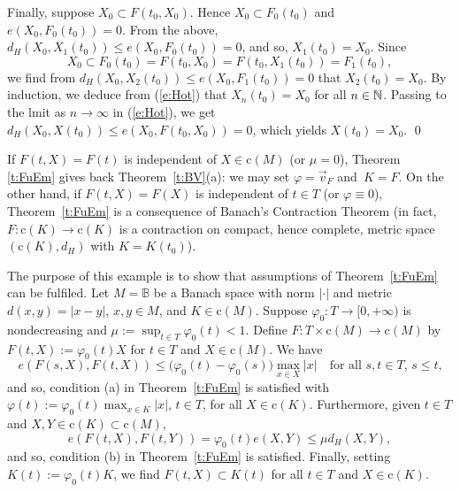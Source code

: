 \documentclass[preprint,12pt]{elsarticle}
\newcommand{\eq}[1]{\mbox{\rm(\ref{#1})}}
\newcommand{\ori}[1]{{\scriptscriptstyle\overrightarrow{\mbox{$#1$}}}}
\begin{document}
\begin{pf}
Finally, suppose $X_0\!\subset\! F(t_0,X_0)$. Hence $X_0\!\subset\! F_0(t_0)$ and
$e(X_0,F_0(t_0))\!=\!0$. From the above,
$d_H(X_0,X_1(t_0))\!\le\! e(X_0,F_0(t_0))\!=\!0$,
and so, $X_1(t_0)\!=\!X_0$. Since
  \begin{equation*}
X_0\subset F_0(t_0)=F(t_0,X_0)=F(t_0,X_1(t_0))=F_1(t_0),
  \end{equation*}
we find from $d_H(X_0,X_2(t_0))\le e(X_0,F_1(t_0))=0$ that $X_2(t_0)=X_0$.
By induction, we deduce from \eq{e:Hot} that $X_n(t_0)=X_0$ for all $n\in\mathbb{N}$.
Passing to the lmit as $n\to\infty$ in \eq{e:Hot}, we get
$d_H(X_0,X(t_0))\le e(X_0,F(t_0,X_0))=0$, which yields $X(t_0)=X_0$.
\qed\end{pf}

\begin{rem}
If $F(t,X)=F(t)$ is independent of $X\in\mbox{c}(M)$ (or $\mu=0$), Theorem~%
\ref{t:FuEm} gives back Theorem~\ref{t:BV}(a): we may set $\varphi=\ori{v}_{F}$
and~$K=F$. On the other hand, if $F(t,X)=F(X)$ is independent of $t\in T$ (or
$\varphi\equiv0$), Theorem~\ref{t:FuEm} is a consequence of Banach's Contraction
Theorem (in fact, $F:\mbox{c}(K)\to\mbox{c}(K)$ is a contraction on compact,
hence complete, metric space $(\mbox{c}(K),d_H)$ with $K=K(t_0)$).
\end{rem}

\begin{exa} \label{ex:6.1}
The purpose of this example is to show that assumptions of Theorem~\ref{t:FuEm}
can be fulfiled. Let $M=\mathbb{B}$ be a Banach space with norm $|\cdot|$ and
metric $d(x,y)=|x-y|$, $x,y\in M$, and $K\in\mbox{c}(M)$. Suppose
$\varphi_0:T\to[0,+\infty)$ is nondecreasing and $\mu\!:=\!\sup_{t\in T}\varphi_0(t)<1$.
Define $F:T\times\mbox{c}(M)\to\mbox{c}(M)$ by $F(t,X):=\varphi_0(t)X$ for
$t\in T$ and $X\in\mbox{c}(M)$. We have
  \begin{equation*}
e(F(s,X),F(t,X))\le\bigl(\varphi_0(t)-\varphi_0(s)\bigr)\max_{x\in X}|x|\quad
\mbox{for all $s,t\in T$, $s\le t$,} 
  \end{equation*}
and so, condition (a) in Theorem~\ref{t:FuEm} is satisfied with
$\varphi(t)\!:=\!\varphi_0(t)\max_{x\in K}|x|$, $t\in T$, for all $X\in\mbox{c}(K)$.
Furthermore, given $t\in T$ and $X,Y\in\mbox{c}(K)\subset\mbox{c}(M)$,
  \begin{equation*}
e(F(t,X),F(t,Y))=\varphi_0(t)e(X,Y)\le\mu d_H(X,Y),
  \end{equation*}
and so, condition (b) in Theorem~\ref{t:FuEm} is satisfied. Finally, setting
$K(t):=\varphi_0(t)K$, we find $F(t,X)\subset K(t)$ for all $t\in T$
and $X\in\mbox{c}(K)$.
\end{exa}
\end{document}
